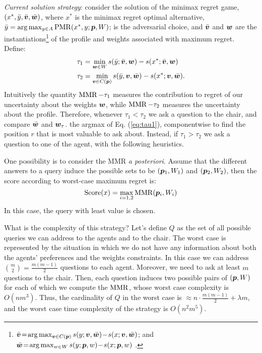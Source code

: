 \medskip \noindent
{\em Current solution strategy}: consider the solution of the minimax regret game, 
 $(x^{*},\bar{y},\bar{\bm{v}},\bar{\bm{w}})$, where $x^{*}$ is the minimax regret optimal alternative,  $\bar{y} = \arg \max_{y \in A} \operatorname{PMR}(x^{*},y; {\bm{p}}, W)$; is the adversarial choice, and $\bar{\bm{v}}$ and $\bm{w}$ are the instantiations\footnote{ $\bar{\bm{v}} \!=\! \arg \max_{\bm{v} \in C({\bm{p}})} s(y; \bm{v}, \bar{\bm{w}}) \!-\! s(x; \bm{v}, \bar{\bm{w}})$; and $\bar{\bm{w}} \!=\! \arg \max_{w \in W} s(y; {\bm{p}}, w) \!-\! s(x; {\bm{p}}, w)$ .} of the profile and weights associated with maximum regret.
Define: 
\begin{align}
\tau_{1} & = \min_{\bm{w} \in W} s(\bar{y}; \bar{\bm{v}}, \bm{w}) - s(x^{*}; \bar{\bm{v}}, \bm{w})  \label{eq:tau1} \\
\tau_{2} & = \min_{\bm{v} \in C({\bm{p}})} s(\bar{y},\bm{v}, \bar{\bm{w}}) -  s(x^{*}; \bm{v}, \bar{\bm{w}}).
\end{align}
Intuitively the quantity $\operatorname{MMR} - \tau_{1} $ measures the contribution to regret of our uncertainty about the weights $\bm{w}$, while $\operatorname{MMR} - \tau_{2} $ measures the uncertainty about the profile.
Therefore, whenever $\tau_{1} < \tau_{2}$ we ask a question to the chair, and compare $\bar{\bm{w}}$ and $\bm{w}_{\tau}$. the argmax of Eq. (\ref{eq:tau1}), componentwise to find the position $r$ that is most valuable to ask about.  
Instead, if $\tau_{1} > \tau_{2}$ we ask a question to one of the agent, with the following heuristics.
 
 One possibility is to consider the MMR {\em a posteriori}. Assume that the different answers to a query induce the possible sets to be $({\bm{p}}_1,W_1)$ and $({\bm{p}}_2,W_2)$, then the score according to worst-case maximum regret is:
\[\operatorname{Score}(x)= \max_{i=1,2} \operatorname{MMR}({\bm{p}}_i,W_i) \]
In this case, the query with least value is chosen.

What is the complexity of this strategy? Let's define $Q$ as the set of all possible queries we can address to the agents and to the chair. The worst case is represented by the situation in which we do not have any information about both the agents' preferences and the weights constraints. In this case we can address $\binom{m}{2}=\frac{m(m-1)}{2}$ questions to each agent. Moreover, we need to ask at least $m$ questions to the chair. Then, each question induces two possible pairs of $({\bm{p}},W)$ for each of which we compute the $\operatorname{MMR}$, whose worst case complexity is $O(nm^3)$. Thus, the cardinality of $Q$ in the worst case is $\approx n \cdot \frac{m(m-1)}{2} + \lambda m$, and the worst case time complexity of the strategy is $O(n^2m^5)$.

